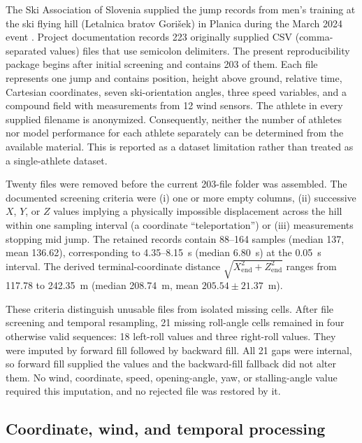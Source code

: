 \documentclass[11pt,twoside,a4paper]{article}
\begin{document}
The Ski Association of Slovenia supplied the jump records from men's training at the ski flying hill (Letalnica bratov Gorišek) in Planica during the March 2024 event \cite{skiassociation2024planica}. Project documentation records 223 originally supplied CSV (comma-separated values) files that use semicolon delimiters. The present reproducibility package begins after initial screening and contains 203 of them. Each file represents one jump and contains position, height above ground, relative time, Cartesian coordinates, seven ski-orientation angles, three speed variables, and a compound field with measurements from 12 wind sensors. The athlete in every supplied filename is anonymized. Consequently, neither the number of athletes nor model performance for each athlete separately can be determined from the available material. This is reported as a dataset limitation rather than treated as a single-athlete dataset.

Twenty files were removed before the current 203-file folder was assembled. The documented screening criteria were (i) one or more empty columns, (ii) successive $X$, $Y$, or $Z$ values implying a physically impossible displacement across the hill within one sampling interval (a coordinate ``teleportation'') or (iii) measurements stopping mid jump. The retained records contain 88--164 samples (median 137, mean 136.62), corresponding to 4.35--8.15~s (median 6.80~s) at the 0.05~s interval. The derived terminal-coordinate distance $\sqrt{X_{\mathrm{end}}^2+Z_{\mathrm{end}}^2}$ ranges from 117.78 to 242.35~m (median 208.74~m, mean $205.54\pm21.37$~m).

These criteria distinguish unusable files from isolated missing cells. After file screening and temporal resampling, 21 missing roll-angle cells remained in four otherwise valid sequences: 18 left-roll values and three right-roll values. They were imputed by forward fill followed by backward fill. All 21 gaps were internal, so forward fill supplied the values and the backward-fill fallback did not alter them. No wind, coordinate, speed, opening-angle, yaw, or stalling-angle value required this imputation, and no rejected file was restored by it.

\subsection{Coordinate, wind, and temporal processing}\label{sec:processing}
\end{document}
